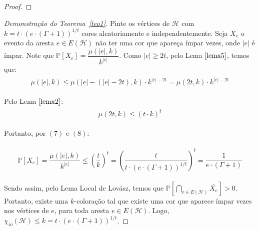 \documentclass[12pt]{article}
\begin{document}
{\begin{proof}
	
\end{proof} \newl

 
\begin{proof}[Demonstração do Teorema~\ref{teo1}]
	Pinte os vértices de $\mathcal{H}$ com $k = t {\cdot} (e {\cdot} (\Gamma + 1))^{1/t}$ cores aleatoriamente e independentemente. Seja $X_{e}$ o evento da aresta $e \in E(\mathcal{H})$ não ter uma cor que apareça ímpar vezes, onde $|e|$ é ímpar. Note que $\mathds{P}[X_{e}] = \dfrac{\mu(|e|, k)}{k^{|e|}}$. Como $|e| \geq 2t$, pelo Lema $\ref{lema5}$, temos que: 
	\begin{align}
		\begin{split}
			\mu(|e|, k) \leq \mu(|e| - (|e| - 2t), k) {\cdot} k^{|e| - 2t} = \mu(2t, k) {\cdot} k^{|e| - 2t}
		\end{split} 
	\end{align} 

	Pelo Lema $\ref{lema2}$:
 	\begin{align}
 		\begin{split}
 			\mu(2t, k) \leq (t {\cdot } k)^t
 		\end{split} 
 	\end{align} 
  
    Portanto, por $(7)$ e $(8)$:
    
	\begin{align}
		\begin{split}
			\mathds{P}[X_{e}] = \dfrac{\mu(|e|, k)}{k^{|e|}} 
			 \leq \left(\dfrac{t}{k}\right)^t  = \left(\dfrac{t}{t {\cdot}   (e {\cdot} (\Gamma + 1))^{1/t}}\right)^t = \dfrac{1}{e {\cdot} (\Gamma + 1)}
		\end{split} 
	\end{align}
	
  Sendo assim, pelo Lema Local de Lovász, temos que $\mathds{P}[\bigcap\limits_{e \in E(\mathcal{H})} \overline{X_{e}} ] > 0$. Portanto, existe uma $k$-coloração tal que existe uma cor que aparece ímpar vezes nos vértices de $e$, para toda aresta $e \in E(\mathcal{H})$. Logo, $\chi_{io}(\mathcal{H}) \leq k = t {\cdot} (e {\cdot} (\Gamma + 1))^{1/t}$.
	
\end{proof}\newbegin
 
}
\end{document}
